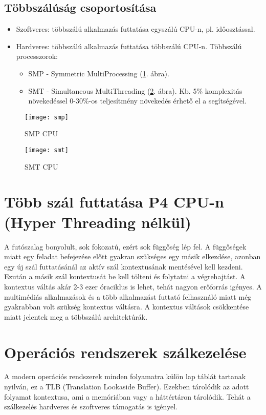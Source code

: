 \subsection{Többszálúság csoportosítása}
\begin{itemize}
    \item Szoftveres: többszálú alkalmazás futtatása egyszálú CPU-n, pl. időosztással.
    \item Hardveres: többszálú alkalmazás futtatása többszálú CPU-n. Többszálú processzorok:
    \begin{itemize}
        \item SMP - Symmetric MultiProcessing (\ref{fig:smp}. ábra).
        \item SMT - Simultaneous MultiThreading (\ref{fig:smt}. ábra). Kb. 5\% komplexitás növekedéssel 0-30\%-os teljesítmény növekedés érhető el a segítségével.
    \end{itemize}
\end{itemize}

\begin{figure}[H]
    \texttt{[image: smp]}
    \centering
    \caption{SMP CPU}
    \label{fig:smp}
\end{figure}
\begin{figure}[H]
    \texttt{[image: smt]}
    \centering
    \caption{SMT CPU}
    \label{fig:smt}
\end{figure}

\section{Több szál futtatása P4 CPU-n (Hyper Threading nélkül)}
A futószalag bonyolult, sok fokozatú, ezért sok függőség lép fel.
A függőségek miatt egy feladat befejezése előtt gyakran szükséges egy másik elkezdése, azonban egy új szál futtatásánál az aktív szál kontextusának mentésével kell kezdeni.
Ezután a másik szál kontextusát be kell tölteni és folytatni a végrehajtást.
A kontextus váltás akár 2-3 ezer óraciklus is lehet, tehát nagyon erőforrás igényes.
A multimédiás alkalmazások és a több alkalmazást futtató felhasználó miatt még gyakrabban volt szükség kontextus váltásra.
A kontextus váltások csökkentése miatt jelentek meg a többszálú architektúrák.

\section{Operációs rendszerek szálkezelése}
A modern operációs rendszerek minden folyamatra külön lap táblát tartanak nyilván, ez a TLB (Translation Lookaside Buffer).
Ezekben tárolódik az adott folyamat kontextusa, ami a memóriában vagy a háttértáron tárolódik.
Tehát a szálkezelés hardveres és szoftveres támogatás is igényel.

